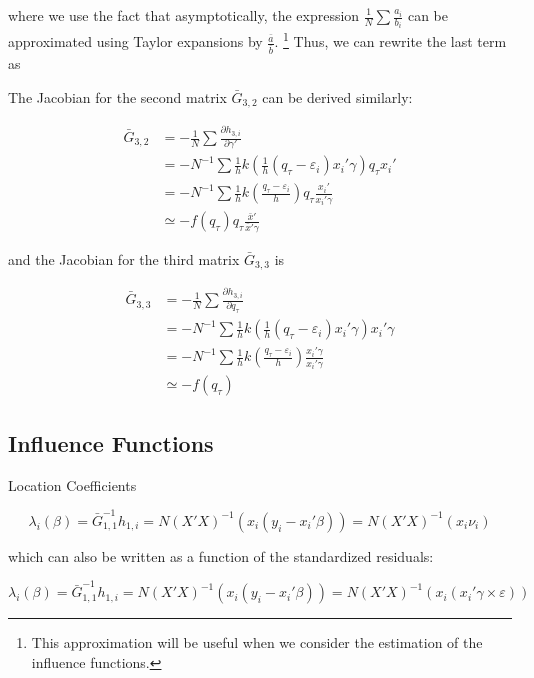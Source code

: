 \documentclass[
  12pt,
  oneside]{article}
\begin{document}
where we use the fact that asymptotically, the expression
\(\frac{1}{N}\sum \frac{a_i}{b_i}\) can be approximated using Taylor
expansions by \(\frac{\bar a}{\bar b}\). \footnote{This approximation
  will be useful when we consider the estimation of the influence
  functions.} Thus, we can rewrite the last term as

The Jacobian for the second matrix \(\bar G_{3,2}\) can be derived
similarly:

\[\begin{aligned}
\bar G_{3,2} &= -\frac{1}{N} \sum \frac{\partial h_{3,i}}{\partial \gamma'} \\
             &= -N^{-1} \sum \frac{1}{h} k\left( \frac{1}{h} ( q_\tau - \varepsilon_i ) x_i'\gamma  \right) q_\tau x_i'  \\
             &= -N^{-1} \sum \frac{1}{h} k\left( \frac{q_\tau - \varepsilon_i}{h}    \right) q_\tau \frac{x_i'}{x_i'\gamma}  \\
             &\simeq  -  f(q_\tau)  q_\tau \frac{\bar x'}{\bar x'\gamma}
\end{aligned}
\]

and the Jacobian for the third matrix \(\bar G_{3,3}\) is

\[\begin{aligned}
\bar G_{3,3} &= -\frac{1}{N} \sum \frac{\partial h_{3,i}}{\partial q_\tau} \\
             &= -N^{-1} \sum \frac{1}{h} k\left( \frac{1}{h} ( q_\tau - \varepsilon_i ) x_i'\gamma  \right) x_i'\gamma  \\
             &= -N^{-1} \sum \frac{1}{h} k\left( \frac{q_\tau - \varepsilon_i}{h}   \right) \frac{x_i'\gamma}{x_i'\gamma}  \\
             &\simeq  -  f(q_\tau)  
\end{aligned}
\]

\subsection{Influence Functions}\label{influence-functions}

Location Coefficients

\[\lambda_i(\beta) = \bar G^{-1}_{1,1} h_{1,i} = N (X'X)^{-1}(x_i (y_i-x_i'\beta)) = N (X'X)^{-1}(x_i \nu_i)
\]

which can also be written as a function of the standardized residuals:

\[\lambda_i(\beta) = \bar G^{-1}_{1,1} h_{1,i} = N (X'X)^{-1}(x_i (y_i-x_i'\beta)) = N (X'X)^{-1}(x_i ( x_i'\gamma \times \varepsilon))
\]
\end{document}

